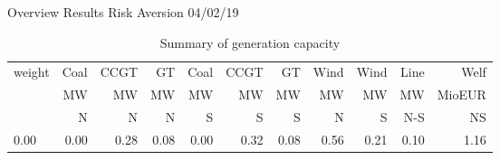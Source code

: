 \documentclass[]{article}
\begin{document}
Overview Results Risk Aversion 04/02/19
\begin{table}[htb]\caption{Summary of generation capacity}
\begin{tabular}{l|rrrrrr|rr|r|r}
\toprule
 weight &    Coal &     CCGT &      GT &   Coal  &   CCGT &      GT &    Wind &    Wind  &    Line   &  Welf   \\
        &      MW &       MW &      MW &      MW &     MW &      MW &      MW &      MW  &    MW     &  MioEUR   \\
        &       N &       N  &      N  &      S  &      S &       S &       N &       S  &    N-S    &   NS    \\
\midrule
        0.00&        0.00&        0.28&        0.08&        0.00&        0.32&        0.08&        0.56&        0.21&        0.10&        1.16\\
\bottomrule
\end{tabular}
\end{table}
\end{document}
